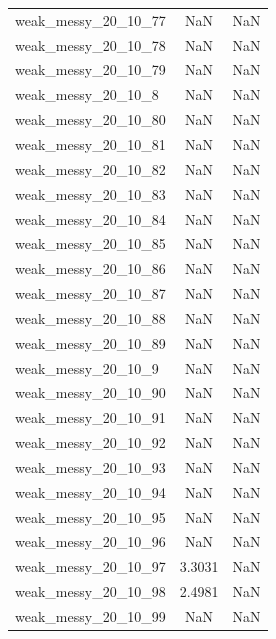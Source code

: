 \begin{longtable}{lcc}
weak\_messy\_20\_10\_77    &      NaN &     NaN \\
weak\_messy\_20\_10\_78    &      NaN &     NaN \\
weak\_messy\_20\_10\_79    &      NaN &     NaN \\
weak\_messy\_20\_10\_8     &      NaN &     NaN \\
weak\_messy\_20\_10\_80    &      NaN &     NaN \\
weak\_messy\_20\_10\_81    &      NaN &     NaN \\
weak\_messy\_20\_10\_82    &      NaN &     NaN \\
weak\_messy\_20\_10\_83    &      NaN &     NaN \\
weak\_messy\_20\_10\_84    &      NaN &     NaN \\
weak\_messy\_20\_10\_85    &      NaN &     NaN \\
weak\_messy\_20\_10\_86    &      NaN &     NaN \\
weak\_messy\_20\_10\_87    &      NaN &     NaN \\
weak\_messy\_20\_10\_88    &      NaN &     NaN \\
weak\_messy\_20\_10\_89    &      NaN &     NaN \\
weak\_messy\_20\_10\_9     &      NaN &     NaN \\
weak\_messy\_20\_10\_90    &      NaN &     NaN \\
weak\_messy\_20\_10\_91    &      NaN &     NaN \\
weak\_messy\_20\_10\_92    &      NaN &     NaN \\
weak\_messy\_20\_10\_93    &      NaN &     NaN \\
weak\_messy\_20\_10\_94    &      NaN &     NaN \\
weak\_messy\_20\_10\_95    &      NaN &     NaN \\
weak\_messy\_20\_10\_96    &      NaN &     NaN \\
weak\_messy\_20\_10\_97    &   3.3031 &     NaN \\
weak\_messy\_20\_10\_98    &   2.4981 &     NaN \\
weak\_messy\_20\_10\_99    &      NaN &     NaN \\
\end{longtable}
